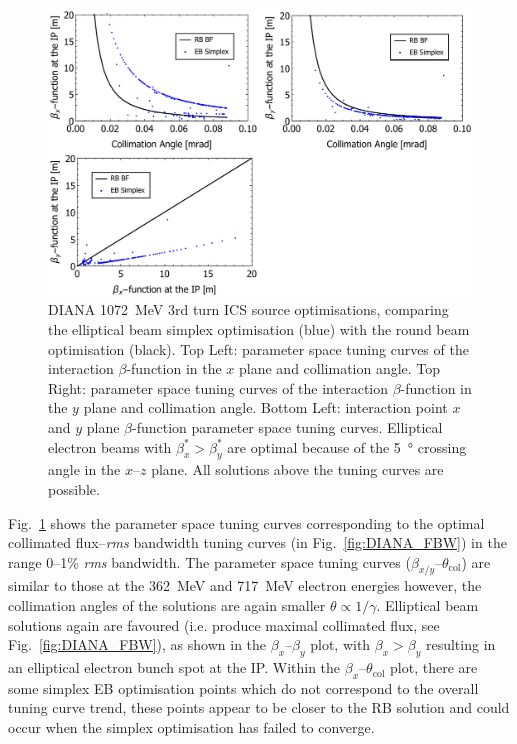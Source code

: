 \documentclass[../main.tex]{subfiles}
\begin{document}
\begin{figure}[!h]
\centering
\includegraphics[width=\textwidth]{Figures/DIANA_Inverse_Compton_Source_Design/DIANA1072param.pdf}
\caption{DIANA 1072~\si{\mega\electronvolt} 3rd turn ICS source optimisations, comparing the elliptical beam simplex optimisation (blue) with the round beam optimisation (black). Top Left: parameter space tuning curves of the interaction $\beta$-function in the $x$ plane and collimation angle. Top Right: parameter space tuning curves of the interaction $\beta$-function in the $y$ plane and collimation angle. Bottom Left: interaction point  $x$ and $y$ plane $\beta$-function parameter space tuning curves. Elliptical electron beams with $\beta_{x}^{*} > \beta_{y}^{*}$ are optimal because of the 5~\si{\degree} crossing angle in the $x$--$z$ plane. All solutions above the tuning curves are possible.}
\label{fig:DIANA1072_param}
\end{figure}
Fig.~\ref{fig:DIANA1072_param} shows the parameter space tuning curves corresponding to the optimal collimated flux--\textit{rms} bandwidth tuning curves (in Fig.~\ref{fig:DIANA_FBW}) in the range 0--1\% \textit{rms} bandwidth. The parameter space tuning curves ($\beta_{x/y}$--$\theta_{\mathrm{col}}$) are similar to those at the 362~\si{\mega\electronvolt} and 717~\si{\mega\electronvolt} electron energies however, the collimation angles of the solutions are again smaller $\theta \propto 1/\gamma$. Elliptical beam solutions again are favoured (i.e. produce maximal collimated flux, see Fig.~\ref{fig:DIANA_FBW}), as shown in the $\beta_{x}$--$\beta_{y}$ plot, with $\beta_{x}>\beta_{y}$ resulting in an elliptical electron bunch spot at the IP. Within the $\beta_x$--$\theta_{\mathrm{col}}$ plot, there are some simplex EB optimisation points which do not correspond to the overall tuning curve trend, these points appear to be closer to the RB solution and could occur when the simplex optimisation has failed to converge. 
\end{document}
